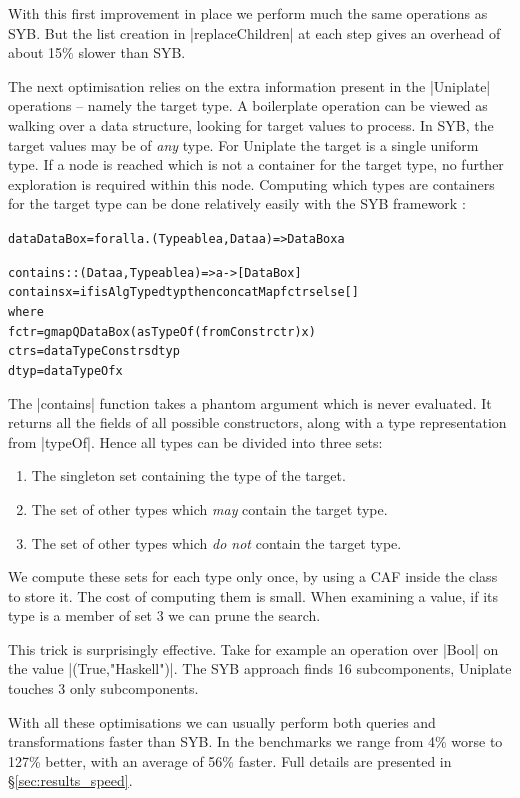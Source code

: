 \documentclass[preprint]{sigplanconf}
\newenvironment{code}{\begin{alltt}\small}{\end{alltt}}
\newcommand{\ignore}{}
\begin{document}
With this first improvement in place we perform much the same operations as SYB. But the list creation in |replaceChildren| at each step gives an overhead of about 15\% slower than SYB.

The next optimisation relies on the extra information present in the |Uniplate| operations -- namely the target type. A boilerplate operation can be viewed as walking over a data structure, looking for target values to process. In SYB, the target values may be of \textit{any} type. For Uniplate the target is a single uniform type. If a node is reached which is not a container for the target type, no further exploration is required within this node. Computing which types are containers for the target type can be done relatively easily with the SYB framework \citep{lammel:syb2}:

\ignore\begin{code}
data DataBox = forall a . (Typeable a, Data a) => DataBox a

contains :: (Data a, Typeable a) => a -> [DataBox]
contains x = if isAlgType dtyp then concatMap f ctrs else []
    where
        f ctr = gmapQ DataBox (asTypeOf (fromConstr ctr) x)
        ctrs = dataTypeConstrs dtyp
        dtyp = dataTypeOf x
\end{code}

The \ignore|contains| function takes a phantom argument which is never evaluated. It returns all the fields of all possible constructors, along with a type representation from |typeOf|. Hence all types can be divided into three sets:

\begin{enumerate}
\item The singleton set containing the type of the target.
\item The set of other types which \textit{may} contain the target type.
\item The set of other types which \textit{do not} contain the target type.
\end{enumerate}

We compute these sets for each type only once, by using a CAF inside the class to store it. The cost of computing them is small. When examining a value, if its type is a member of set 3 we can prune the search.

This trick is surprisingly effective. Take for example an operation over |Bool| on the value |(True,"Haskell")|. The SYB approach finds 16 subcomponents, Uniplate touches 3 only subcomponents.

With all these optimisations we can usually perform both queries and transformations faster than SYB. In the benchmarks we range from 4\% worse to 127\% better, with an average of 56\% faster. Full details are presented in \S\ref{sec:results_speed}.
\end{document}
